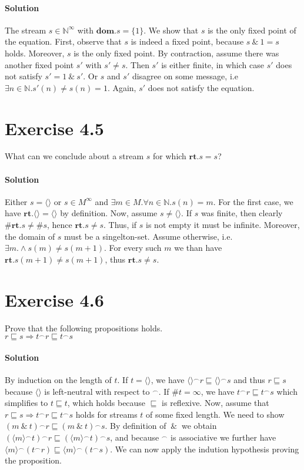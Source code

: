 \documentclass{article}[12pt]
\newcommand{\concat}{\ensuremath{^{\frown}}}
\newcommand{\cons}{\ \&\ }
\newcommand{\stream}[1]{\langle#1\rangle}
\newcommand{\naturals}{\ensuremath{\mathbb{N}}}
\newcommand{\prefixordering}{\ensuremath{\sqsubseteq}}
\newcommand{\length}{\ensuremath{\#}}
\newcommand{\rt}{\ensuremath{\textbf{rt}}}
\newcommand{\dom}{\ensuremath{\textbf{dom}}}
\begin{document}
   \paragraph{Solution}{
       The stream $s \in \naturals^{\infty}$ with $\dom.s = \{1\}$.
       We show that $s$ is the only fixed point of the equation.
       First, observe that $s$ is indeed a fixed point, because $s \cons 1 = s$ holds.
       Moreover, $s$ is the only fixed point. By contraction, assume there was another
       fixed point $s'$ with $s' \neq s$. Then $s'$ is either finite, in which case
       $s'$ does not satisfy $s' = 1 \cons s'$. Or $s$ and $s'$ disagree on some message, i.e $\exists n \in \naturals . s'(n) \neq s(n) = 1$. Again, $s'$ does not satisfy the equation.
   }
   \section{Exercise 4.5}
   What can we conclude about a stream $s$ for which $\rt.s = s$?
   \paragraph{Solution}{
       Either $s = \stream{}$ or $s \in M^{\infty}$ and $\exists m \in M.\forall n \in \naturals.s(n) = m$.
       For the first case, we have $\rt.\stream{} = \stream{}$ by definition.
       Now, assume $s \neq \stream{}$.
       If $s$ was finite, then clearly $\length \rt.s \neq \length s$, hence $\rt.s \neq s$.
       Thus, if $s$ is not empty it must be infinite. Moreover, the domain of $s$ must be a singelton-set.
       Assume otherwise, i.e. $\exists m. \land s(m) \neq s(m+1)$. For every such $m$ we than have $\rt.s(m+1) \neq s(m+1)$,
       thus $\rt.s \neq s$.
   }
   \section{Exercise 4.6}
   Prove that the following propositions holds.\\
   $r \prefixordering s \Rightarrow t \concat r \prefixordering t \concat s$
   \paragraph{Solution}{
       By induction on the length of $t$.
       If $t = \stream{}$, we have $\stream{} \concat r \prefixordering \stream{} \concat s$
       and thus $r \prefixordering s$ because $\stream{}$ is left-neutral with respect to $\concat$.
       If $\length t = \infty$, we have $t \concat r \prefixordering t \concat s$ which simplifies to
       $t \prefixordering t$, which holds because $\prefixordering$ is reflexive.
       Now, assume that $r \prefixordering s \Rightarrow t \concat r \prefixordering t \concat s$ holds
       for streams $t$ of some fixed length. We need to show $(m \cons t) \concat r \prefixordering (m \cons t) \concat s$. By definition of $\cons$ we obtain $(\stream{m} \concat t) \concat r \prefixordering (\stream{m} \concat t) \concat s$, and because $\concat$ is associative we further have $\stream{m} \concat (t \concat r) \prefixordering \stream{m} \concat (t \concat s)$. We can now apply the indution hypothesis proving the proposition.
   }
\end{document}
